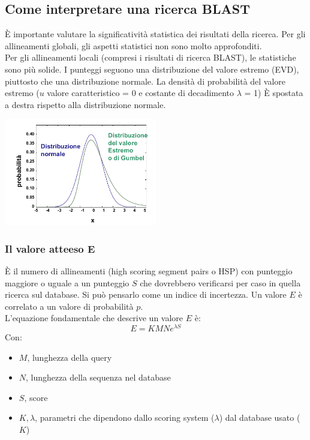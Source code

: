 \documentclass{article}
\begin{document}
\subsection{Come interpretare una ricerca BLAST}
È importante valutare la significatività statistica dei risultati
della ricerca. Per gli allineamenti globali, gli aspetti statistici non sono
molto approfonditi.\\
Per gli allineamenti locali (compresi i risultati di ricerca
BLAST), le statistiche sono più solide. I punteggi seguono
una distribuzione del valore estremo (EVD), piuttosto che
una distribuzione normale.
La densità di probabilità del valore estremo
($u$ valore caratteristico = 0 e costante di decadimento $\lambda$ = 1)
È spostata a destra rispetto alla distribuzione normale.
\begin{center}
    \includegraphics[width=0.5\textwidth]{figures/dist.png}
\end{center}
\subsubsection{Il valore atteeso E}
È il numero di allineamenti (high scoring segment pairs o HSP)
con punteggio maggiore o uguale a un punteggio $S$ che
dovrebbero verificarsi per caso in quella ricerca sul database.
Si può pensarlo come un indice di incertezza.
Un valore $E$ è correlato a un valore di probabilità $p$.\\
L'equazione fondamentale che descrive un valore $E$ è: 
$$ E = KMN e^{\lambda S}$$
Con:
\begin{itemize}
    \item $M$, lunghezza della query
    \item $N$, lunghezza della sequenza nel database
    \item $S$, score
    \item $K, \lambda$, parametri che dipendono dallo scoring system ($\lambda$) dal database usato ($K$)
\end{itemize}
\end{document}

